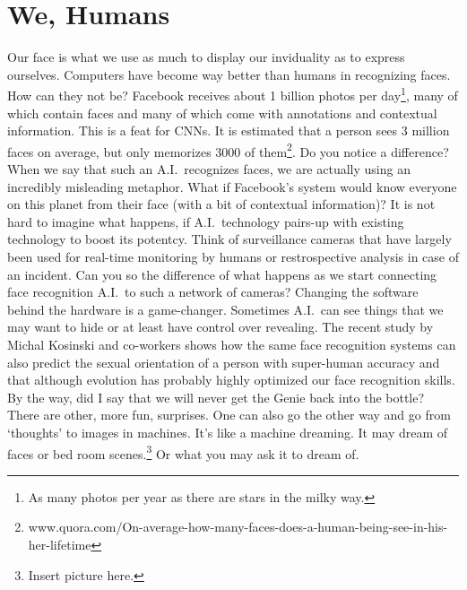 \documentclass[a4]{article}
\begin{document}
\section{We, Humans}

\noindent Our face is what we use as much to display our inviduality as to express ourselves. Computers have become way better than humans in recognizing faces. How can they not be? Facebook receives about 1 billion photos per day\footnote{As many photos per year as there are stars in the milky way.}, many of which contain faces and many of which come with annotations and contextual information. This is a feat for CNNs. It is estimated that a person sees 3 million faces on average, but only memorizes 3000 of them\footnote{www.quora.com/On-average-how-many-faces-does-a-human-being-see-in-his-her-lifetime}. Do you notice a difference? When we say that such an A.I.~recognizes faces, we are actually using an incredibly misleading metaphor. What if Facebook's system would know everyone on this planet from their face (with a bit of contextual information)? It is not hard to imagine what happens, if A.I.~technology pairs-up with existing technology to boost its potentcy. Think of surveillance cameras that have largely been used for real-time monitoring by humans or restrospective analysis in case of an incident. Can you so the difference of what happens as we start connecting face recognition A.I.~to such a network of cameras? Changing the software behind the hardware is a game-changer. Sometimes A.I.~can see things that we may want to hide or at least have control over revealing. The recent study by Michal Kosinski and co-workers shows how the same face recognition systems can also predict the sexual orientation of a person with super-human accuracy and that although evolution has probably highly optimized our face recognition skills. By the way, did I say that we will never get the Genie back into the bottle? There are other, more fun, surprises. One can also go the other way and go from `thoughts' to images in machines. It's like a machine dreaming. It may dream of faces or bed room scenes.\footnote{Insert picture here.} Or what you may ask it to dream of. \\
\end{document}
